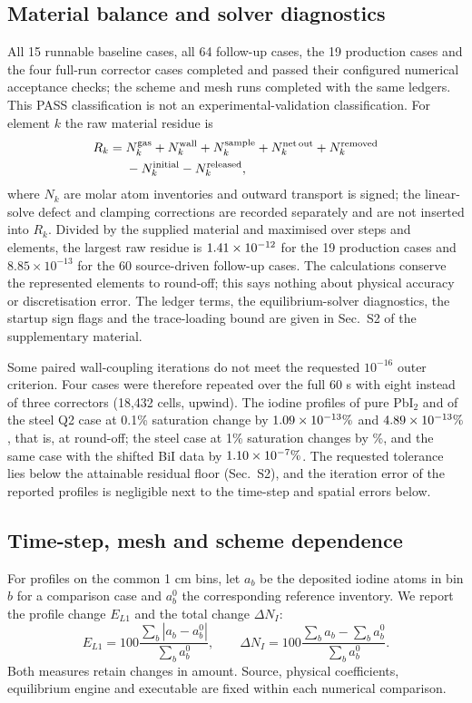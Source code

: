 \subsection{Material balance and solver diagnostics}
\label{sec:conservation}
All 15 runnable baseline cases, all 64 follow-up cases, the 19
production cases and the four full-run corrector cases completed and
passed their configured numerical acceptance checks; the scheme and
mesh runs completed with the same ledgers. This PASS classification is
not an experimental-validation classification. For element $k$ the raw
material residue is
\begin{equation}
 \begin{aligned}
 R_k={}&N_k^{\rm gas}+N_k^{\rm wall}+N_k^{\rm sample}
     +N_k^{\rm net\,out}+N_k^{\rm removed}\\
     &-N_k^{\rm initial}-N_k^{\rm released},
 \end{aligned}
 \label{eq:balance}
\end{equation}
where $N_k$ are molar atom inventories and outward transport is signed;
the linear-solve defect and clamping corrections are recorded separately
and are not inserted into $R_k$. Divided by the supplied material and
maximised over steps and elements, the largest raw residue is
$1.41\times10^{-12}$ for the 19 production cases and
$8.85\times10^{-13}$ for the 60 source-driven follow-up cases. The
calculations conserve the represented elements to round-off; this says
nothing about physical accuracy or discretisation error. The ledger
terms, the equilibrium-solver diagnostics, the startup sign flags and
the trace-loading bound are given in Sec.~S2 of the supplementary
material.

Some paired wall-coupling iterations do not meet the requested
$10^{-16}$ outer criterion. Four cases were therefore repeated over the
full 60 s with eight instead of three correctors (18,432 cells, upwind).
The iodine profiles of pure PbI$_2$ and of the steel Q2 case at 0.1\%
saturation change by $1.09\times10^{-13}\%$ and $4.89\times10^{-13}\%$, that is, at
round-off; the steel case at 1\% saturation changes by
\IterSteelHigh\%, and the same case with the shifted BiI data by
$1.10\times10^{-7}\%$. The requested tolerance lies below the attainable
residual floor (Sec.~S2), and the iteration error of the reported
profiles is negligible next to the time-step and spatial errors below.

\subsection{Time-step, mesh and scheme dependence}
For profiles on the common 1 cm bins, let $a_b$ be the deposited
iodine atoms in bin $b$ for a comparison case and $a_b^0$ the
corresponding reference inventory. We report the profile change
$E_{L1}$ and the total change $\Delta N_I$:
\begin{equation}
 E_{L1}=100\frac{\sum_b|a_b-a_b^0|}{\sum_b a_b^0},
 \qquad
 \Delta N_I=100\frac{\sum_b a_b-\sum_b a_b^0}{\sum_b a_b^0}.
 \label{eq:numeric-l1}
\end{equation}
Both measures retain changes in amount. Source, physical coefficients,
equilibrium engine and executable are fixed within each numerical
comparison.

